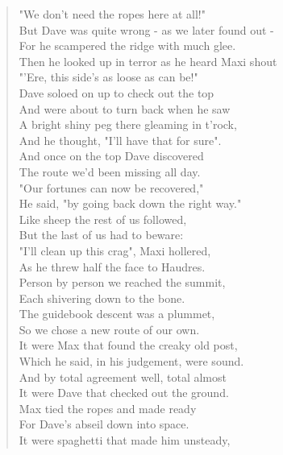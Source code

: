 \documentclass[a5paper,openany,font 10pt]{scrbook}
\begin{document}
\begin{verse}
"We don't need the ropes here at all!"\\
\vspace*{1em}
But Dave was quite wrong - as we later found out -\\
For he scampered the ridge with much glee.\\
Then he looked up in terror as he heard Maxi shout\\
"'Ere, this side's as loose as can be!"\\
\vspace*{1em}
Dave soloed on up to check out the top\\
And were about to turn back when he saw\\
A bright shiny peg there gleaming in t'rock,\\
And he thought, "I'll have that for sure".\\
\vspace*{1em}
And once on the top Dave discovered\\
The route we'd been missing all day.\\
"Our fortunes can now be recovered,"\\
He said, "by going back down the right way."\\
\vspace*{1em}
Like sheep the rest of us followed,\\
But the last of us had to beware:\\
"I'll clean up this crag", Maxi hollered,\\
As he threw half the face to Haudres.\\
\vspace*{1em}
Person by person we reached the summit,\\
Each shivering down to the bone.\\
The guidebook descent was a plummet,\\
So we chose a new route of our own.\\
\vspace*{1em}
It were Max that found the creaky old post,\\
Which he said, in his judgement, were sound.\\
And by total agreement  well, total almost\\
It were Dave that checked out the ground.\\
\vspace*{1em}
Max tied the ropes and made ready\\
For Dave's abseil down into space.\\
It were spaghetti that made him unsteady,\\

\end{verse}
\end{document}

